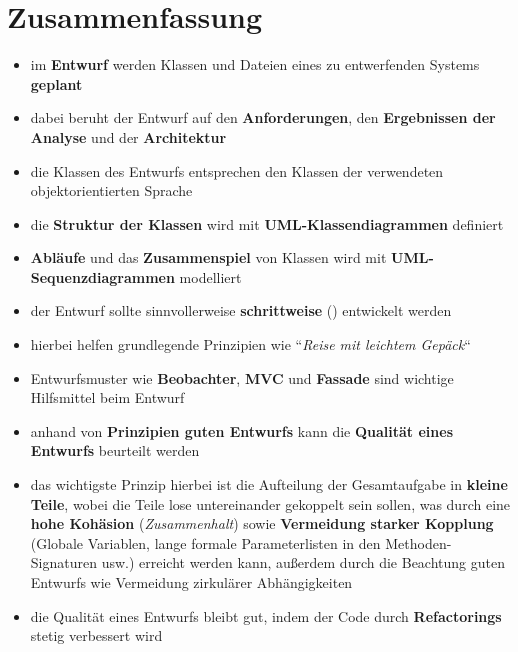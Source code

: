 \section{Zusammenfassung}


\begin{itemize}
    \item im \textbf{Entwurf} werden Klassen und Dateien eines zu entwerfenden Systems \textbf{geplant}
    \item dabei beruht der Entwurf auf den \textbf{Anforderungen}, den \textbf{Ergebnissen der Analyse} und der \textbf{Architektur}
    \item die Klassen des Entwurfs entsprechen den Klassen der verwendeten objektorientierten Sprache
    \item die \textbf{Struktur der Klassen} wird mit \textbf{UML-Klassendiagrammen} definiert
    \item \textbf{Abläufe} und das \textbf{Zusammenspiel} von Klassen wird mit \textbf{UML-Sequenzdiagrammen} modelliert
    \item der Entwurf sollte sinnvollerweise \textbf{schrittweise} () entwickelt werden
    \item hierbei helfen grundlegende Prinzipien wie ``\textit{Reise mit leichtem Gepäck}``
    \item Entwurfsmuster wie \textbf{Beobachter}, \textbf{MVC} und \textbf{Fassade} sind wichtige Hilfsmittel beim Entwurf
    \item anhand von \textbf{Prinzipien guten Entwurfs} kann die \textbf{Qualität eines Entwurfs} beurteilt werden
    \item das wichtigste Prinzip hierbei ist die Aufteilung der Gesamtaufgabe in \textbf{kleine Teile}, wobei die Teile lose untereinander gekoppelt sein sollen, was durch eine \textbf{hohe Kohäsion} (\textit{Zusammenhalt}) sowie \textbf{Vermeidung starker Kopplung} (Globale Variablen, lange formale Parameterlisten in den Methoden-Signaturen usw.) erreicht werden kann, außerdem durch die Beachtung guten Entwurfs wie Vermeidung zirkulärer Abhängigkeiten
    \item die Qualität eines Entwurfs bleibt gut, indem der Code durch \textbf{Refactorings} stetig verbessert wird
\end{itemize}